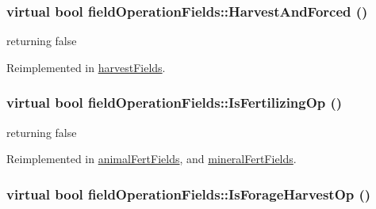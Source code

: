 \label{classfield_operation_fields_afbf28b06e95ccb00f99383765e080c29}
\hypertarget{classfield_operation_fields_aad34a4f52c734a152ad3768fca005b6e}{
\subsubsection[{HarvestAndForced}]{\setlength{\rightskip}{0pt plus 5cm}virtual bool fieldOperationFields::HarvestAndForced ()}}
\label{classfield_operation_fields_aad34a4f52c734a152ad3768fca005b6e}


returning false 

Reimplemented in \hyperlink{classharvest_fields_a3928ef45dc41fa069fcde4ff23f69d54}{harvestFields}.\hypertarget{classfield_operation_fields_ae21a07b4ab147829465e5b79418708f7}{
\subsubsection[{IsFertilizingOp}]{\setlength{\rightskip}{0pt plus 5cm}virtual bool fieldOperationFields::IsFertilizingOp ()}}
\label{classfield_operation_fields_ae21a07b4ab147829465e5b79418708f7}


returning false 

Reimplemented in \hyperlink{classanimal_fert_fields_a793fca221cb66cef70bbfcb1cf124680}{animalFertFields}, and \hyperlink{classmineral_fert_fields_a73b4d9ac6b06da725809f785a88edff1}{mineralFertFields}.\hypertarget{classfield_operation_fields_adc42e16ecf40bc87b2b073e7aa3e42b4}{
\subsubsection[{IsForageHarvestOp}]{\setlength{\rightskip}{0pt plus 5cm}virtual bool fieldOperationFields::IsForageHarvestOp ()}}
\label{classfield_operation_fields_adc42e16ecf40bc87b2b073e7aa3e42b4}


